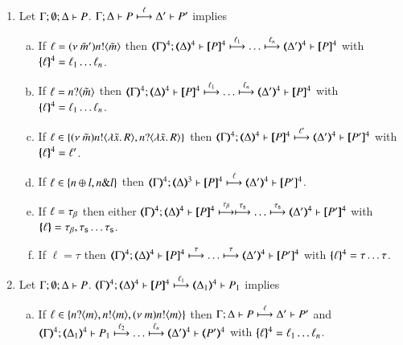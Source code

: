\begin{proposition}\rm
	\label{prop:op_cor:pHOp_to_HOp}
%
	\begin{enumerate}
		\item	Let $\Gamma; \emptyset; \Delta \vdash P$.
			$\Gamma; \Delta \vdash P \stackrel{\ell}{\longmapsto} \Delta' \vdash P'$ implies
%
			\begin{enumerate}[a)]
				\item	If $\ell = (\nu\ \tilde{m}') n ! \langle \tilde{m} \rangle$ then
					$\horel{\tmap{\Gamma}{4}}{\tmap{\Delta}{4}}{\pmap{P}{4}}{\hby{\ell_1} \dots \hby{\ell_n}}{\tmap{\Delta'}{4}}{\pmap{P}{4}}$
					with $\{\!\!\{\ell\}\!\!\}^{4} = \ell_1 \dots \ell_n$.

				\item	If $\ell = n ? \langle \tilde{m} \rangle$ then
					$\horel{\tmap{\Gamma}{4}}{\tmap{\Delta}{4}}{\pmap{P}{4}}{\hby{\ell_1} \dots \hby{\ell_n}}{\tmap{\Delta'}{4}}{\pmap{P}{4}}$
					with $\{\!\!\{\ell\}\!\!\}^{4} = \ell_1 \dots \ell_n$.

				\item	If $\ell \in \{(\nu\ \tilde{m}) n ! \langle \lambda \tilde{x}.\,R \rangle, n ? \langle \lambda \tilde{x}.\,R \rangle\}$ then
					$\horel{\tmap{\Gamma}{4}}{\tmap{\Delta}{4}}{\pmap{P}{4}}{\hby{\ell'}}
					{\tmap{\Delta'}{4}}{\pmap{P'}{4}}$ with $\{\!\!\{\ell\}\!\!\}^{4} = \ell'$.

				\item	If $\ell \in \{n \oplus l, n \& l\}$ then
					$\horel{\tmap{\Gamma}{4}}{\tmap{\Delta}{3}}{\pmap{P}{4}}{\hby{\ell}}
					{\tmap{\Delta'}{4}}{\pmap{P'}{4}}$.

				\item	If $\ell = \tau_{\beta}$ then either
					$\horel{\tmap{\Gamma}{4}}{\tmap{\Delta}{4}}{\pmap{P}{4}}{\hby{\btau} \hby{\stau} \dots \hby{\stau}}
					{\tmap{\Delta'}{4}}{\pmap{P'}{4}}$ with $\{\!\!\{\ell\}\!\!\} = \tau_{\beta}, \tau_{\mathsf{s}} \dots \tau_{\mathsf{s}}$.

				\item	If $\ell = \tau$ then %
					$\horel{\tmap{\Gamma}{4}}{\tmap{\Delta}{4}}{\pmap{P}{4}}{\hby{\tau} \dots \hby{\tau}}
					{\tmap{\Delta'}{4}}{\pmap{P'}{4}}$ with $\{\!\!\{\ell\}\!\!\}^{4} = \tau \dots \tau$.
			\end{enumerate}

		\item	Let $\Gamma; \emptyset; \Delta \vdash P$.
			$\horel{\tmap{\Gamma}{4}}{\tmap{\Delta}{4}}{\pmap{P}{4}}{\hby{\ell_1}}
			{\tmap{\Delta_1}{4}}{P_1}$ implies
%
			\begin{enumerate}[a)]
				\item	If $\ell \in \{n ? \langle m \rangle, n ! \langle m \rangle, (\nu\ m) n ! \langle m \rangle\}$ then
					$\Gamma; \Delta \vdash P \stackrel{\ell}{\longmapsto} \Delta' \vdash P'$ and\\
					$\horel{\tmap{\Gamma}{4}}{\tmap{\Delta_1}{4}}{P_1}{\hby{\ell_2} \dots \hby{\ell_n}}
					{\tmap{\Delta'}{4}}{\tmap{P'}{4}}$ with $\{\!\!\{\ell\}\!\!\}^{4} = \ell_1 \dots \ell_n$.


\end{enumerate}
\end{enumerate}
\end{proposition}
